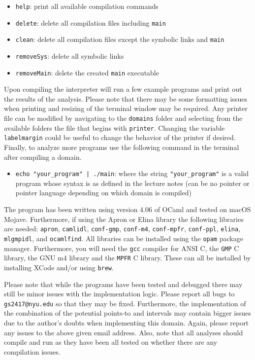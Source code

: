 \documentclass [10pt]{article}
\begin{document}
\begin{itemize}
  \item \verb|help|: print all available compilation commands
  \item \verb|delete|: delete all compilation files including \verb|main|
  \item \verb|clean|: delete all compilation files except the symbolic links and \verb|main|
  \item \verb|removeSys|: delete all symbolic links
  \item \verb|removeMain|: delete the created \verb|main| executable
\end{itemize}
Upon compiling the interpreter will run a few example programs and print out the results of the analysis. Please note that there may be some formatting issues when printing and resizing of the terminal window may be required. Any printer file can be modified by navigating to the \verb|domains| folder and selecting from the available folders the file that begins with \verb|printer|. Changing the variable \verb|labelmargin| could be useful to change the behavior of the printer if desired. Finally, to analyze more programs use the following command in the terminal after compiling a domain.
\begin{itemize}
  \item \verb=echo "your_program" | ./main=: where the string \verb|"your_program"| is a valid program whose syntax is as defined in the lecture notes (can be no pointer or pointer language depending on which domain is compiled)
\end{itemize}
The program has been written using version 4.06 of OCaml and tested on macOS Mojave. Furthermore, if using the Apron or Elina library the following libraries are needed: \verb|apron|, \verb|camlidl|, \verb|conf-gmp|, \verb|conf-m4|, \verb|conf-mpfr|, \verb|conf-ppl|, \verb|elina|, \verb|mlgmpidl|, and \verb|ocamlfind|. All libraries can be installed using the \verb|opam| package manager. Furthermore, you will need the \verb|gcc| compiler for ANSI C, the \verb|GMP| C library, the GNU m4 library and the \verb|MPFR| C library. These can all be installed by installing XCode and/or using \verb|brew|.\par
Please note that while the programs have been tested and debugged there may still be minor issues with the implementation logic. Please report all bugs to \verb|gs2417@nyu.edu| so that they may be fixed. Furthermore, the implementation of the combination of the potential points-to and intervals may contain bigger issues due to the author's doubts when implementing this domain. Again, please report any issues to the above given email address. Also, note that all analyses should compile and run as they have been all tested on whether there are any compilation issues.\par
\end{document}
